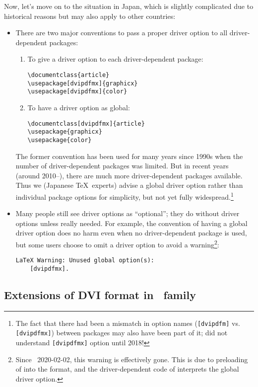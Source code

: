 \documentclass[a4paper,11pt,dvipdfmx]{article}
\def\code#1{\texttt{#1}}
\begin{document}
Now, let's move on to the situation in Japan,
which is slightly complicated due to historical reasons
but may also apply to other countries:
\begin{itemize}
  \item There are two major conventions to pass a proper driver option
    to all driver-dependent packages:
    \begin{enumerate}
      \item To give a driver option to each driver-dependent package:
\begin{verbatim}
\documentclass{article}
\usepackage[dvipdfmx]{graphicx}
\usepackage[dvipdfmx]{color}
\end{verbatim}
      \item To have a driver option as global:
\begin{verbatim}
\documentclass[dvipdfmx]{article}
\usepackage{graphicx}
\usepackage{color}
\end{verbatim}
    \end{enumerate}
    The former convention has been used for many years since 1990s
    when the number of driver-dependent packages was limited.
    But in recent years (around 2010--), there are much more
    driver-dependent packages available. Thus
    we (Japanese \TeX\ experts) advise a global driver option
    rather than individual package options for simplicity,
    but not yet fully widespread.\footnote{The fact that
    there had been a mismatch in option names
    (\code{[dvipdfm]} vs. \code{[dvipdfmx]})
    between packages may also have been part of it;
     did not understand \code{[dvipdfmx]} option until 2018!}
  \item Many people still see driver options as ``optional'';
    they do without driver options unless really needed.
    For example, the convention of having a global driver option
    does no harm even when no driver-dependent package is used, but
    some users choose to omit a driver option to avoid a warning\footnote{%
    Since \LaTeXe~2020-02-02, this warning is effectively gone. This is due
    to preloading of  into the format, and the driver-dependent
    code of  interprets the global driver option.}:
\begin{verbatim}
LaTeX Warning: Unused global option(s):
    [dvipdfmx].
\end{verbatim}
\end{itemize}

\subsection{Extensions of DVI format in \pTeX\ family}
\end{document}

